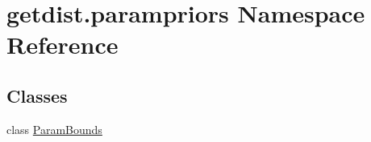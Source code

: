 \hypertarget{namespacegetdist_1_1parampriors}{}\section{getdist.\+parampriors Namespace Reference}
\label{namespacegetdist_1_1parampriors}
\subsection*{Classes}
\begin{DoxyCompactItemize}
\item 
class \mbox{\hyperlink{classgetdist_1_1parampriors_1_1ParamBounds}{Param\+Bounds}}
\end{DoxyCompactItemize}

